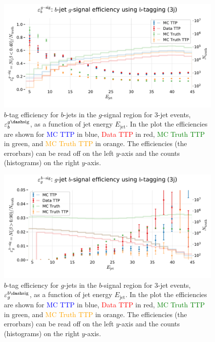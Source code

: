 \begin{figure}
  \centerfloat
  \includegraphics[width=1.1\textwidth, trim=20 30 0 40, clip]{figures/quarks/eff_b_gsig-down_sample=1.00-ML_vars=vertex-selection=b-ejet_min=4-n_iter_RS_lgb=99-n_iter_RS_xgb=9-cdot_cut=0.90-version=19.pdf}
  \caption[$b$-Tagging Efficiency $\varepsilon_b^{g\dash\mathrm{sig}}$ as a Function of Jet Energy]
          {$b$-tag efficiency for $b$-jets in the $g$-signal region for 3-jet events, $\varepsilon_b^{g\dash\mathrm{sig}}$, as a function of jet energy $E_\mathrm{jet}$. In the plot the efficiencies are shown for \textcolor{blue}{MC TTP} in blue, \textcolor{red}{Data TTP} in red, \textcolor{green}{MC Truth TTP} in green, and \textcolor{orange}{MC Truth TTP} in orange. The efficiencies (the errorbars) can be read off on the left $y$-axis and the counts (histograms) on the right $y$-axis.} 
  \label{fig:q:effiency_btag_bjet_gsig}
\end{figure}


\begin{figure}
  \centerfloat
  \includegraphics[width=1.1\textwidth, trim=20 30 0 40, clip]{figures/quarks/eff_g_bsig-down_sample=1.00-ML_vars=vertex-selection=b-ejet_min=4-n_iter_RS_lgb=99-n_iter_RS_xgb=9-cdot_cut=0.90-version=19.pdf}
  \caption[$b$-Tagging Efficiency $\varepsilon_g^{b\dash\mathrm{sig}}$ as a Function of Jet Energy]
          {$b$-tag efficiency for $g$-jets in the $b$-signal region for 3-jet events, $\varepsilon_g^{b\dash\mathrm{sig}}$, as a function of jet energy $E_\mathrm{jet}$. In the plot the efficiencies are shown for \textcolor{blue}{MC TTP} in blue, \textcolor{red}{Data TTP} in red, \textcolor{green}{MC Truth TTP} in green, and \textcolor{orange}{MC Truth TTP} in orange. The efficiencies (the errorbars) can be read off on the left $y$-axis and the counts (histograms) on the right $y$-axis.} 
  \label{fig:q:effiency_btag_gjet_bsig}
\end{figure}


